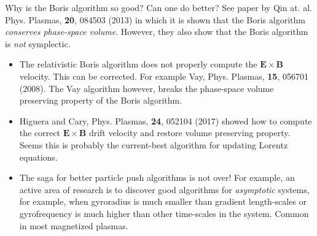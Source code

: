 \documentclass[pdf]{beamer}
\newcommand{\mvec}[1]{\mathbf{#1}}
\theoremstyle{definition}
\begin{document}
\begin{frame}{Why is the Boris algorithm so good? Can one do better?}
  \small%
  See paper by Qin at. al. Phys. Plasmas, {\bf 20}, 084503 (2013) in
  which it is shown that the Boris algorithm \emph{conserves
    phase-space volume}. However, they also show that the Boris
  algorithm is \emph{not} symplectic.
  \begin{itemize}
  \item The relativistic Boris algorithm does not properly compute the
    $\mvec{E}\times\mvec{B}$ velocity. This can be corrected. For
    example Vay, Phys. Plasmas, {\bf 15}, 056701 (2008). The Vay
    algorithm however, breaks the phase-space volume preserving
    property of the Boris algorithm.
  \item Higuera and Cary, Phys. Plasmas, {\bf 24}, 052104 (2017)
    showed how to compute the correct $\mvec{E}\times\mvec{B}$ drift
    velocity and restore volume preserving property. Seems this is
    probably the current-best algorithm for updating Lorentz
    equations.
  \item The saga for better particle push algorithms is not over! For
    example, an active area of research is to discover good algorithms
    for \emph{asymptotic} systems, for example, when gyroradius is
    much smaller than gradient length-scales or gyrofrequency is much
    higher than other time-scales in the system. Common in most
    magnetized plasmas.
  \end{itemize}  
\end{frame}

\end{document}
